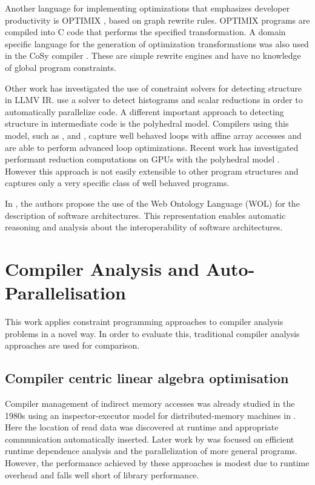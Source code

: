     Another language for implementing optimizations that emphasizes developer
    productivity is OPTIMIX \citep{Assmann1996,Assmann98optimix}, based on graph
    rewrite rules.
    OPTIMIX programs are compiled into C code that performs the specified
    transformation.
    A domain specific language for the generation of optimization
    transformations was also used in the CoSy compiler \citep{Alt1994}.
    These are simple rewrite engines and have no knowledge of global program
    constraints.

    Other work has investigated the use of constraint solvers for
    detecting structure in LLMV IR.
    \citet{ginsbach2017discovery} use a solver to detect histograms and
    scalar reductions in order to automatically parallelize code.
    A different important approach to detecting structure in intermediate
    code is the polyhedral model.
    Compilers using this model, such as
    \citet{Lengauer2012Polly}, \citet{Baskaran:2010:ACC:2175462.2175482} and
    \citet{Verdoolaege:2013:PPC:2400682.2400713}, capture well behaved
    loops with affine array accesses and are able to perform advanced loop
    optimizations.
    Recent work has investigated performant reduction computations on GPUs with
    the polyhedral model \citep{Reddy2016Reduction}.
    However this approach is not easily extensible to other program structures
    and captures only a very specific class of well behaved programs.

    In \citet{Yuan:2017:TOS:3101282.3101287}, the authors propose the use of the
    Web Ontology Language (WOL) for the description of software architectures.
    This representation enables automatic reasoning and analysis about the
    interoperability of software architectures.

\section{Compiler Analysis and Auto-Parallelisation}

    This work applies constraint programming approaches to compiler analysis
    problems in a novel way.
    In order to evaluate this, traditional compiler analysis approaches are
    used for comparison.

\subsection{Compiler centric linear algebra optimisation}

    Compiler management of indirect memory accesses was already studied in the
    1980s using an inspector-executor model for distributed-memory machines in
    \citet{Baxter:1989:RPS:72935.72967}.
    Here the location of read data was discovered at runtime and appropriate
    communication automatically inserted.
    Later work by \citet{pottenger1995idiom,fisher1994parallelizing,
    rauchwerger1999lrpd,suganuma1996detection} was focused on efficient runtime
    dependence analysis and the parallelization of more general programs.
    However, the performance achieved by these approaches is modest due to
    runtime overhead and falls well short of library performance.

